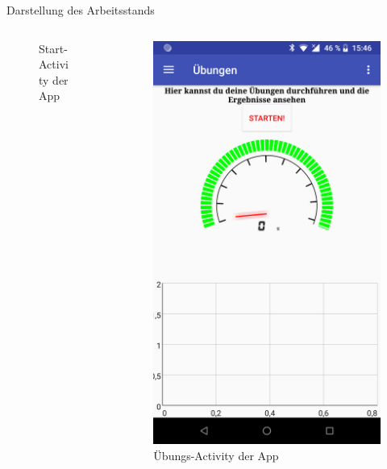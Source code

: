 \documentclass[hyphens]{beamer}
\begin{document}
\begin{frame}{Darstellung des Arbeitsstands}
\begin{columns}[T]
\begin{column}{0.5\textwidth}
\begin{figure}
  \caption{Start-Activity der App}
  \end{figure}
  \end{column}
  \begin{column}{0.5\textwidth}
  \begin{figure}
  \includegraphics[scale=0.05]{img/layout_exercise}
  \caption{Übungs-Activity der App}
  \end{figure}
  \end{column}
 \end{columns}
 \end{frame}
\end{document}
